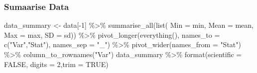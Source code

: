 \documentclass[
]{article}
\newenvironment{Shaded}{\begin{snugshade}}{\end{snugshade}}
\newcommand{\AttributeTok}[1]{\textcolor[rgb]{0.77,0.63,0.00}{#1}}
\newcommand{\ConstantTok}[1]{\textcolor[rgb]{0.00,0.00,0.00}{#1}}
\newcommand{\DecValTok}[1]{\textcolor[rgb]{0.00,0.00,0.81}{#1}}
\newcommand{\FunctionTok}[1]{\textcolor[rgb]{0.00,0.00,0.00}{#1}}
\newcommand{\NormalTok}[1]{#1}
\newcommand{\OtherTok}[1]{\textcolor[rgb]{0.56,0.35,0.01}{#1}}
\newcommand{\SpecialCharTok}[1]{\textcolor[rgb]{0.00,0.00,0.00}{#1}}
\newcommand{\StringTok}[1]{\textcolor[rgb]{0.31,0.60,0.02}{#1}}
\begin{document}
\hypertarget{sumaarise-data}{%
\subsubsection{Sumaarise Data}\label{sumaarise-data}}

\begin{Shaded}
\begin{Highlighting}[]
\NormalTok{data\_summary }\OtherTok{\textless{}{-}}\NormalTok{ data[}\SpecialCharTok{{-}}\DecValTok{1}\NormalTok{] }\SpecialCharTok{\%\textgreater{}\%}
  \FunctionTok{summarise\_all}\NormalTok{(}\FunctionTok{list}\NormalTok{(}
    \AttributeTok{Min =}\NormalTok{ min, }
    \AttributeTok{Mean =}\NormalTok{ mean, }
    \AttributeTok{Max =}\NormalTok{ max,}
    \AttributeTok{SD =}\NormalTok{ sd)) }\SpecialCharTok{\%\textgreater{}\%}
  \FunctionTok{pivot\_longer}\NormalTok{(}\FunctionTok{everything}\NormalTok{(),}
               \AttributeTok{names\_to =} \FunctionTok{c}\NormalTok{(}\StringTok{"Var"}\NormalTok{,}\StringTok{"Stat"}\NormalTok{),}
               \AttributeTok{names\_sep =} \StringTok{"\_"}\NormalTok{) }\SpecialCharTok{\%\textgreater{}\%}
  \FunctionTok{pivot\_wider}\NormalTok{(}\AttributeTok{names\_from =} \StringTok{"Stat"}\NormalTok{) }\SpecialCharTok{\%\textgreater{}\%} \FunctionTok{column\_to\_rownames}\NormalTok{(}\StringTok{"Var"}\NormalTok{) }
\NormalTok{data\_summary }\SpecialCharTok{\%\textgreater{}\%} \FunctionTok{format}\NormalTok{(}\AttributeTok{scientific =} \ConstantTok{FALSE}\NormalTok{, }\AttributeTok{digits =} \DecValTok{2}\NormalTok{,}\AttributeTok{trim =} \ConstantTok{TRUE}\NormalTok{)  }
\end{Highlighting}
\end{Shaded}
\end{document}
